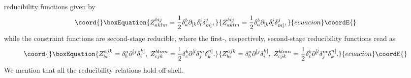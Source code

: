 \documentclass[a4paper,12pt]{article}
\begin{document}
reducibility functions given by 
\begin{equation}\coord{}\boxEquation{
Z_{aklm}^{bij}=\frac{1}{2}\delta _{a}^{b}\partial _{[k}\delta _{l}^{i}\delta
_{m]}^{j},  \label{xx14}
}{
Z_{aklm}^{bij}=\frac{1}{2}\delta _{a}^{b}\partial _{[k}\delta _{l}^{i}\delta
_{m]}^{j},  }{ecuacion}\coordE{}\end{equation}
while the constraint functions \coordHE{} are second-stage
reducible, where the first-, respectively, second-stage reducibility
functions read as 
\begin{equation}\coord{}\boxEquation{
Z_{bi}^{ajk}=\delta _{b}^{a}\partial ^{[j}\delta _{i}^{k]},\;Z_{cjk}^{blmn}=
\frac{1}{2}\delta _{c}^{b}\partial ^{[l}\delta _{j}^{m}\delta _{k}^{n]}.
\label{xx15}
}{
Z_{bi}^{ajk}=\delta _{b}^{a}\partial ^{[j}\delta _{i}^{k]},\;Z_{cjk}^{blmn}=
\frac{1}{2}\delta _{c}^{b}\partial ^{[l}\delta _{j}^{m}\delta _{k}^{n]}.
}{ecuacion}\coordE{}\end{equation}
We mention that all the reducibility relations hold off-shell.
\end{document}
